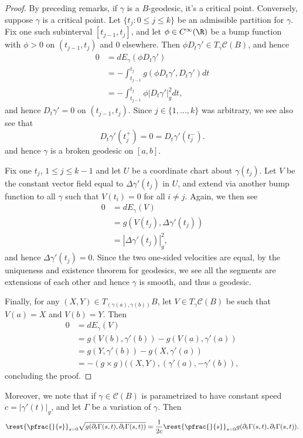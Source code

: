 \begin{proof}
By preceding remarks, if $\gamma$ is a $B$-geodesic, it's a critical point.  Conversely, suppose $\gamma$ is a critical point.  Let $\{t_j:0\leq j\leq k\}$ be an admissible partition for $\gamma$.  Fix one such subinterval $[t_{j-1},t_j]$, and let $\phi\in C^\infty(\R)$ be a bump function with $\phi>0$ on $(t_{j-1},t_j)$ and $0$ elsewhere.  Then $\phi D_t\gamma'\in T_\gamma\mathcal{C}(B)$, and hence
\begin{align*}
	0&=dE_\gamma(\phi D_t\gamma')\\
	&=-\int_{t_{j-1}}^{t_j}g(\phi D_t\gamma',D_t\gamma')dt\\
	&=-\int_{t_{j-1}}^{t_j}\phi|D_t\gamma'|_g^2dt,
\end{align*}
and hence $D_t\gamma'=0$ on $(t_{j-1},t_j)$.  Since $j\in\{1,...,k\}$ was arbitrary, we see also see that
$$D_t\gamma'(t_j^+)=0=D_t\gamma'(t_j^-).$$
and hence $\gamma$ is a broken geodesic on $[a,b]$.

Fix one $t_j$, $1\leq j\leq k-1$ and let $U$ be a coordinate chart about $\gamma(t_j)$.  Let $V$ be the constant vector field equal to $\Delta\gamma'(t_j)$ in $U$, and extend via another bump function to all $\gamma$ such that $V(t_i)=0$ for all $i\neq j$.  Again, we then see
\begin{align*}
	0&=dE_\gamma(V)\\
	&=g(V(t_j),\Delta\gamma'(t_j))\\
	&=|\Delta\gamma'(t_j)|_g^2,
\end{align*}
and hence $\Delta\gamma'(t_j)=0$.  Since the two one-sided velocities are equal, by the uniqueness and existence theorem for geodesics, we see all the segments are extensions of each other and hence $\gamma$ is smooth, and thus a geodesic.

Finally, for any $(X,Y)\in T_{(\gamma(a),\gamma(b))}B$, let $V\in T_\gamma\mathcal{C}(B)$ be such that $V(a)=X$ and $V(b)=Y$.  Then
\begin{align*}
	0&=dE_\gamma(V)\\
	&=g(V(b),\gamma'(b))-g(V(a),\gamma'(a))\\
	&=g(Y,\gamma'(b))-g(X,\gamma'(a))\\
	&=-(g\times g)((X,Y),(\gamma'(a),-\gamma'(b)),
\end{align*}
concluding the proof.
\end{proof}

Moreover, we note that if $\gamma\in\mathcal{C}(B)$ is parametrized to have constant speed $c=|\gamma'(t)|_g$, and let $\Gamma$ be a variation of $\gamma$.  Then
$$\rest{\pfrac{}{s}}_{s=0}\sqrt{g(\partial_t\Gamma(s,t),\partial_t\Gamma(s,t))}=\frac{1}{2c}\rest{\pfrac{}{s}}_{s=0}g(\partial_t\Gamma(s,t),\partial_t\Gamma(s,t)).$$

